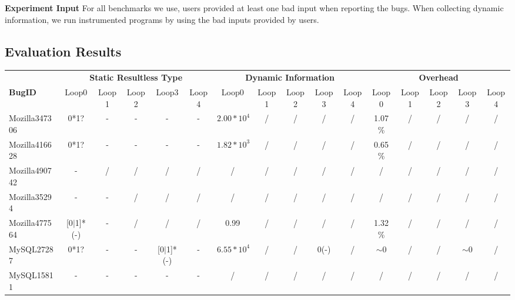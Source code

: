 {\bf Experiment Input} 
For all benchmarks we use, 
users provided at least one bad input when reporting the bugs. 
When collecting dynamic information, 
we run instrumented programs by using the bad inputs provided by users.  

\subsection{Evaluation Results}

\begin{table*}
  \centering
  \tiny
  \newcommand{\Yes}[1]{\checkmark{}$_#1$}
  \newcommand{\No}[0]{-}
  \begin{tabular}{lccccccccccccccc}
    \toprule
              &  \multicolumn{5}{c}{\bf Static Resultless Type} & \multicolumn{5}{c}{\bf Dynamic Information} & \multicolumn{5}{c}{\bf Overhead}\\
\cmidrule(lr){2-6} \cmidrule(lr){7-11} \cmidrule(lr){12-16}
   {\bf BugID}      & Loop0 & Loop1 &  Loop2 &   Loop3 &   Loop4 & Loop0     &   Loop1 &   Loop2 &  Loop3 &   Loop4 &   Loop0 & Loop1 &   Loop2 &  Loop3 &  Loop4 \\
    \midrule
    Mozilla347306   & 0*1?          & \No   & \No    &   \No          & \No     & $2.00*10^4$ & /       & /       &  /     &  /      &   1.07\%   &   /   &   /     &  /      &  /\\
    Mozilla416628   & 0*1?          & \No   & \No    & \No            &   \No   & $1.82*10^3$ & /       & /       &  /     &  /      &   0.65\%   &   /   &   /     &  /       &  /\\
    Mozilla490742   & \No           & /     & /      & /              &   /     & /           & /       & /       &  /     &  /      &   /        &   /   &   /     &  /       &  /\\
    Mozilla35294    & \No           & \No   & /      & /              &   /     & /           & /       & /       &  /     &  /      &   /        &   /   &   /     &  /       &  /\\
    Mozilla477564   & [0$|$1]*(\No) & \No   & /      & /              &   /     & 0.99        & /       & /       &  /     &  /      &   1.32\%   &   /   &   /     &  /       &  /\\
    \midrule
    MySQL27287      & 0*1?          & \No   & \No    & [0$|$1]*(\No)   &   \No  & $6.55*10^4$ & /       & /        &  0(\No)  &  /         &  $\sim$0    &   /      &   /  &  $\sim$0 &  /\\
    MySQL15811      & \No           & \No   & \No    & \No      &   \No   & /        & /      & /       &  /       &  /       &   /      &   /      &   /      &  /       &  /\\

\end{tabular}
\end{table*}
